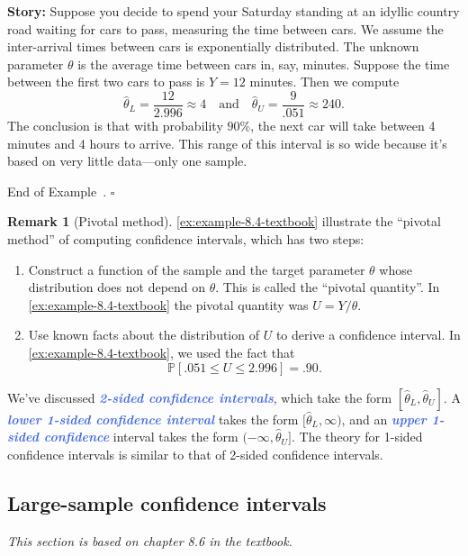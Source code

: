 \documentclass[10pt]{article}
\theoremstyle{definition}
\newtheorem{remark}[theorem]{Remark}
\newtheorem{example}[theorem]{Example}
\renewenvironment{example}
{\begin{oldexample}}
  {\par\smallskip\hfill   End of Example~\theexample. $\square$    \par\end{oldexample}}
\newcommand{\1}[1]{\textbf{1}_{\left[#1\right]}} %
\def\P{\mathbb{P}} %
\newcommand{\demph}[1]{\textcolor{RoyalBlue}{\textbf{\slshape #1}}} %
\begin{document}
\begin{example}[Example 8.4 in textbook]
  \textbf{Story:} Suppose you decide to spend your Saturday standing at an
  idyllic country road waiting for cars to pass, measuring the time between
  cars. We assume the inter-arrival times between cars is exponentially
  distributed. The unknown parameter $\theta$ is the average time between cars
  in, say, minutes. Suppose the time between the first two cars to pass is
  $Y=12$ minutes. Then we compute
 \begin{equation*}
   \widehat{\theta}_{L}= \frac{12}{2.996} \approx 4
    \quad \text{and} \quad 
    \widehat{\theta}_{U}= \frac{9}{.051}\approx 240.
  \end{equation*}
  The conclusion is that with probability $90\%$, the next car will take
  between 4 minutes and 4 hours to arrive. This range of this interval is so
  wide because it's based on very little data---only one sample.
\end{example}

\begin{remark}[Pivotal method]
  \label{rmk:pivotal-method}
  \cref{ex:example-8.4-textbook} illustrate the ``pivotal method'' of
  computing confidence intervals, which has two steps:
  \begin{enumerate}
    \item Construct a function of the sample and the target parameter $\theta$
    whose distribution does not depend on $\theta$. This is called the
    ``pivotal quantity''. In \cref{ex:example-8.4-textbook} the pivotal
    quantity was $U=Y/\theta$.
    \item Use known facts about the distribution of $U$ to derive a confidence
    interval. In \cref{ex:example-8.4-textbook}, we used the fact that
    \begin{equation*}
      \P\left[.051 \leq U \leq 2.996\right]= .90.
    \end{equation*}
  \end{enumerate}
\end{remark}

We've discussed \demph{2-sided confidence intervals}, which take the form
$[\widehat{\theta}_{L},\widehat{\theta}_{U}]$. A \demph{lower 1-sided
  confidence interval} takes the form $[\widehat{\theta}_{L},\infty)$, and an
\demph{upper 1-sided confidence} interval takes the form
$(-\infty,\widehat{\theta}_{U}]$. The theory for 1-sided confidence intervals
is similar to that of 2-sided confidence intervals.

\subsection{Large-sample confidence intervals}
\textit{This section is based on chapter 8.6 in the textbook.}
\end{document}
